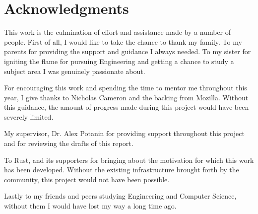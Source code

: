 \chapter*{Acknowledgments}\label{C:ack} 

This work is the culmination of effort and assistance made by a number of people. First of all, I would like to take the chance to thank my family. To my parents for providing the support and guidance I always needed. To my sister for igniting the flame for pursuing Engineering and getting a chance to study a subject area I was genuinely passionate about.

For encouraging this work and spending the time to mentor me throughout this year, I give thanks to Nicholas Cameron and the backing from Mozilla. Without this guidance, the amount of progress made during this project would have been severely limited.

My supervisor, Dr. Alex Potanin for providing support throughout this project and for reviewing the drafts of this report.

To Rust, and its supporters for bringing about the motivation for which this work has been developed. Without the existing infrastructure brought forth by the community, this project would not have been possible.

Lastly to my friends and peers studying Engineering and Computer Science, without them I would have lost my way a long time ago.